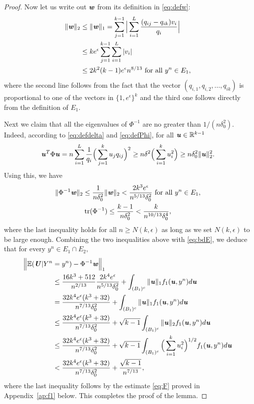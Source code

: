 \documentclass[11pt,onecolumn]{IEEEtran}
\def\mathbi#1{{\textbf{\textit #1}}}
\DeclareMathOperator{\tr}{tr}
\begin{document}
\begin{proof}
Now let us write out $\mathbi{w}$ from its definition in \eqref{eq:defw}:
     \begin{align*}
\|\mathbi{w}\|_2 &\le \|\mathbi{w}\|_1 = 
        \sum_{j=1}^{k-1} \Big| \sum_{i=1}^L  \frac{
               (q_{ij}-q_{ik}) v_i  }{q_i} \Big|\\
&\le k e^{\epsilon} \sum_{j=1}^{k-1}  \sum_{i=1}^L  |v_i|\\
&\le 2k^2(k-1) e^{\epsilon} n^{8/13} \text{~for all~} y^n\in E_1,
\end{align*}
where the second line follows from the fact that the vector 
$(q_{i,1}, q_{i,2}, \dots, q_{ik})$ is proportional to one of the vectors in $\{1,e^{\epsilon}\}^k$ and
the third one follows directly from the definition of $E_1.$

Next we claim that all the eigenvalues of $\Phi^{-1}$ are no greater than $1/(n\delta_0^2).$ Indeed,
according to \eqref{eq:defdelta} and \eqref{eq:defPhi}, for all $\mathbi{u}\in\mathbb{R}^{k-1}$
   \begin{equation}\label{eq:Pn}
\mathbi{u}^T \Phi \mathbi{u} = n
\sum_{i=1}^L \frac{1}{q_i} \Big(\sum_{j=1}^k u_j q_{ij} \Big)^2
\ge n \delta^2 \Big( \sum_{i=1}^k u_i^2 \Big)
\ge n \delta_0^2  \|\mathbi{u}\|_2^2 .
\end{equation}
Using this, we have
 \begin{gather*}
\| \Phi^{-1}\mathbi{w} \|_2 \le \frac{1}{n \delta_0^2} \| \mathbi{w} \|_2
< \frac{2k^3 e^{\epsilon}}{n^{5/13} \delta_0^2}  \text{~for all~} y^n\in E_1,\\
\tr(\Phi^{-1}) \le \frac{k-1}{n\delta_0^2} < \frac{k}{n^{10/13}\delta_0^4},
  \end{gather*}
where the last inequality
 holds for all $n\ge N(k,\epsilon)$ as long as we set $N(k,\epsilon)$ to be large enough.
Combining the two inequalities above with \eqref{eq:bdE}, we deduce that for every $y^n \in E_1\cap E_2,$
\begin{align}
     \Big\| \mathbb{E}(\mathbi{U}|Y^n & =y^n) - \Phi^{-1}\mathbi{w} \Big\|_1 \nonumber\\
 & \le  \frac{16k^3 + 512}{n^{2/13} } \frac{2k^4e^{\epsilon}}{n^{5/13}\delta_0^2}
+ \int_{ (B_1)^c} \|\mathbi{u}\|_1 f_1(\mathbi{u},y^n) d\mathbi{u} \nonumber\\
 & =  \frac{32k^4 e^{\epsilon}(k^3+32)}{n^{7/13}\delta_0^2}
+ \int_{ (B_1)^c} \|\mathbi{u}\|_1 f_1(\mathbi{u},y^n) d\mathbi{u} \nonumber\\
 & \le  \frac{32k^4 e^{\epsilon}(k^3+32)}{n^{7/13}\delta_0^2}
+ \sqrt{k-1} \int_{ (B_1)^c} \|\mathbi{u}\|_2 f_1(\mathbi{u},y^n) d\mathbi{u} \nonumber\\
 & \le  \frac{32k^4 e^{\epsilon}(k^3+32)}{n^{7/13}\delta_0^2}
+ \sqrt{k-1} \int_{ (B_1)^c} \Big(\sum_{i=1}^k u_i^2 \Big)^{1/2} f_1(\mathbi{u},y^n) d\mathbi{u} \nonumber\\
& <  \frac{32k^4 e^{\epsilon}(k^3+32)}{n^{7/13}\delta_0^2}
+ \frac{\sqrt{k-1}}{n^{7/13}},\label{eq:EU}
\end{align}
where the last inequality follows by the estimate \eqref{eq:F} proved in Appendix~\ref{ap:f1} below.
This completes the proof of the lemma.
\end{proof}
\end{document}
